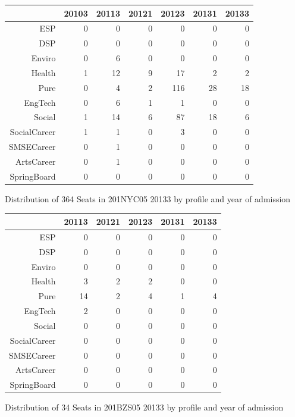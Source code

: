 \documentclass{article}\usepackage[]{graphicx}\usepackage[]{color}
\begin{document}
\begin{figure}[H]
\centering
\begin{tabular}{rrrrrrr}
  \hline
 & 20103 & 20113 & 20121 & 20123 & 20131 & 20133 \\ 
  \hline
ESP &   0 &   0 &   0 &   0 &   0 &   0 \\ 
  DSP &   0 &   0 &   0 &   0 &   0 &   0 \\ 
  Enviro &   0 &   6 &   0 &   0 &   0 &   0 \\ 
  Health &   1 &  12 &   9 &  17 &   2 &   2 \\ 
  Pure &   0 &   4 &   2 & 116 &  28 &  18 \\ 
  EngTech &   0 &   6 &   1 &   1 &   0 &   0 \\ 
  Social &   1 &  14 &   6 &  87 &  18 &   6 \\ 
  SocialCareer &   1 &   1 &   0 &   3 &   0 &   0 \\ 
  SMSECareer &   0 &   1 &   0 &   0 &   0 &   0 \\ 
  ArtsCareer &   0 &   1 &   0 &   0 &   0 &   0 \\ 
  SpringBoard &   0 &   0 &   0 &   0 &   0 &   0 \\ 
   \hline
\end{tabular}
\caption{Distribution of 364 Seats in 201NYC05 20133 by profile and year of admission} 
\end{figure}
\begin{figure}[H]
\centering
\begin{tabular}{rrrrrr}
  \hline
 & 20113 & 20121 & 20123 & 20131 & 20133 \\ 
  \hline
ESP &   0 &   0 &   0 &   0 &   0 \\ 
  DSP &   0 &   0 &   0 &   0 &   0 \\ 
  Enviro &   0 &   0 &   0 &   0 &   0 \\ 
  Health &   3 &   2 &   2 &   0 &   0 \\ 
  Pure &  14 &   2 &   4 &   1 &   4 \\ 
  EngTech &   2 &   0 &   0 &   0 &   0 \\ 
  Social &   0 &   0 &   0 &   0 &   0 \\ 
  SocialCareer &   0 &   0 &   0 &   0 &   0 \\ 
  SMSECareer &   0 &   0 &   0 &   0 &   0 \\ 
  ArtsCareer &   0 &   0 &   0 &   0 &   0 \\ 
  SpringBoard &   0 &   0 &   0 &   0 &   0 \\ 
   \hline
\end{tabular}
\caption{Distribution of 34 Seats in 201BZS05 20133 by profile and year of admission} 
\end{figure}
\end{document}
